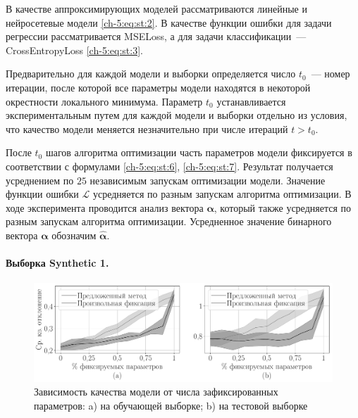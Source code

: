 В качестве аппроксимирующих моделей рассматриваются линейные и нейросетевые модели \eqref{ch-5:eq:st:2}. В качестве функции ошибки для задачи регрессии рассматривается MSELoss, а для задачи классификации~--- CrossEntropyLoss \eqref{ch-5:eq:st:3}.

Предварительно для каждой модели и выборки определяется число $t_0$~--- номер итерации, после которой все параметры модели находятся в некоторой окрестности локального минимума. Параметр $t_0$ устанавливается экспериментальным путем для каждой модели и выборки отдельно из условия, что качество модели меняется незначительно при числе итераций $t>t_0$.

После $t_0$ шагов алгоритма оптимизации часть параметров модели фиксируется в соответствии с формулами \eqref{ch-5:eq:st:6}, \eqref{ch-5:eq:st:7}. Результат получается усреднением по $25$ независимым запускам оптимизации модели. Значение функции ошибки $\mathcal{L}$ усредняется по разным запускам алгоритма оптимизации. В ходе эксперимента проводится анализ вектора $\bm{\alpha}$, который также усредняется по разным запускам алгоритма оптимизации. Усредненное значение бинарного вектора  $\bm{\alpha}$ обозначим $\hat{\bm{\alpha}}$.

\paragraph{Выборка Synthetic 1.}

\begin{figure}[h!t]\center
\includegraphics[width=1\textwidth]{results/order/generate_data_neural_loss}
\caption{Зависимость качества модели от числа зафиксированных параметров: a) на обучающей выборке; b) на тестовой выборке}
\label{ch-5:fg:ex:syn3:1}
\end{figure}

